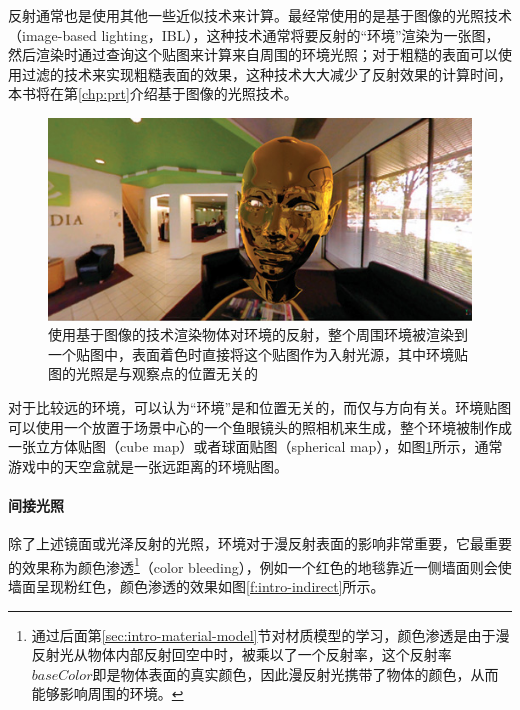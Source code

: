 反射通常也是使用其他一些近似技术来计算。最经常使用的是基于图像的光照技术（image-based lighting，IBL），这种技术通常将要反射的“环境”渲染为一张图，然后渲染时通过查询这个贴图来计算来自周围的环境光照；对于粗糙的表面可以使用过滤的技术来实现粗糙表面的效果，这种技术大大减少了反射效果的计算时间，本书将在第\ref{chp:prt}介绍基于图像的光照技术。

\begin{figure}
\includegraphics[width=1.\textwidth]{figures/intro/reflection-1}	
\caption{使用基于图像的技术渲染物体对环境的反射，整个周围环境被渲染到一个贴图中，表面着色时直接将这个贴图作为入射光源，其中环境贴图的光照是与观察点的位置无关的}
\label{f:intro-reflection-2}
\end{figure}

对于比较远的环境，可以认为“环境”是和位置无关的，而仅与方向有关。环境贴图可以使用一个放置于场景中心的一个鱼眼镜头的照相机来生成，整个环境被制作成一张立方体贴图（cube map）或者球面贴图（spherical map），如图\ref{f:intro-reflection-2}所示，通常游戏中的天空盒就是一张远距离的环境贴图。




\paragraph{间接光照}
除了上述镜面或光泽反射的光照，环境对于漫反射表面的影响非常重要，它最重要的效果称为颜色渗透\footnote{通过后面第\ref{sec:intro-material-model}节对材质模型的学习，颜色渗透是由于漫反射光从物体内部反射回空中时，被乘以了一个反射率，这个反射率$baseColor$即是物体表面的真实颜色，因此漫反射光携带了物体的颜色，从而能够影响周围的环境。}（color bleeding），例如一个红色的地毯靠近一侧墙面则会使墙面呈现粉红色，颜色渗透的效果如图\ref{f:intro-indirect}所示。

